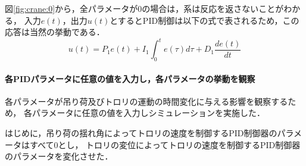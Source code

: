 \documentclass[dvipdfmx,titlepage,a4j]{jsarticle}  %
\begin{document}
図\ref{fig:crane:0}から，全パラメータが0の場合は，系は反応を返さないことがわかる，
入力$e(t)$，出力$u(t)$とするとPID制御は以下の式で表されるため，この応答は当然の挙動である．
\begin{equation}
  u(t) = P_1 e(t) + I_1 \int_0^t e(\tau) d\tau + D_1 \frac{de(t)}{dt} \nonumber
\end{equation}

\paragraph{各PIDパラメータに任意の値を入力し，各パラメータの挙動を観察\\}
各パラメータが吊り荷及びトロリの運動の時間変化に与える影響を観察するため，
各パラメータに任意の値を入力しシミュレーションを実施した．

はじめに，吊り荷の揺れ角によってトロリの速度を制御するPID制御器のパラメータはすべて0とし，
トロリの変位によってトロリの速度を制御するPID制御器のパラメータを変化させた．
\end{document}
